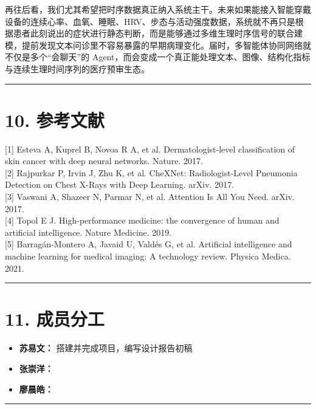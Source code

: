\documentclass[
  chinese,
  12pt,
  UTF8,
  a4paper]{ctexart}
\begin{document}
再往后看，我们尤其希望把时序数据真正纳入系统主干。未来如果能接入智能穿戴设备的连续心率、血氧、睡眠、HRV、步态与活动强度数据，系统就不再只是根据患者此刻说出的症状进行静态判断，而是能够通过多维生理时序信号的联合建模，提前发现文本问诊里不容易暴露的早期病理变化。届时，多智能体协同网络就不仅是多个``会聊天''的 Agent，而会变成一个真正能处理文本、图像、结构化指标与连续生理时间序列的医疗预审生态。

\begin{center}\rule{0.5\linewidth}{0.5pt}\end{center}

\section{10. 参考文献}\label{10-ux53c2ux8003ux6587ux732e}

{[}1{]} Esteva A, Kuprel B, Novoa R A, et al. Dermatologist-level classification of skin cancer with deep neural networks. Nature. 2017.\\
{[}2{]} Rajpurkar P, Irvin J, Zhu K, et al. CheXNet: Radiologist-Level Pneumonia Detection on Chest X-Rays with Deep Learning. arXiv. 2017.\\
{[}3{]} Vaswani A, Shazeer N, Parmar N, et al. Attention Is All You Need. arXiv. 2017.\\
{[}4{]} Topol E J. High-performance medicine: the convergence of human and artificial intelligence. Nature Medicine. 2019.\\
{[}5{]} Barragán-Montero A, Javaid U, Valdés G, et al. Artificial intelligence and machine learning for medical imaging: A technology review. Physica Medica. 2021.

\begin{center}\rule{0.5\linewidth}{0.5pt}\end{center}

\section{11. 成员分工}\label{11-ux6210ux5458ux5206ux5de5}

\begin{itemize}[leftmargin=*, label={}]
    \item \textbf{苏易文：} 搭建并完成项目，编写设计报告初稿
    \item \textbf{张崇洋：} 
    \item \textbf{廖晨皓：} 
\end{itemize}

\begin{center}\rule{0.5\linewidth}{0.5pt}\end{center}
\end{document}
